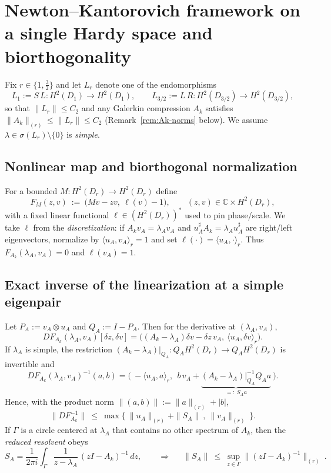 \documentclass[11pt]{article}
\begin{document}
\section{Newton--Kantorovich framework on a single Hardy space and biorthogonality}
\label{sec:NK-single}

Fix \(r\in\{1,\tfrac32\}\) and let \(L_r\) denote one of the endomorphisms
\[
L_1:=S\,L: H^2(D_1)\to H^2(D_1),
\qquad
L_{3/2}:=L\,R: H^2(D_{3/2})\to H^2(D_{3/2}),
\]
so that \(\|L_r\|\le C_2\) and any Galerkin compression \(A_k\) satisfies
\(\|A_k\|_{(r)}\le \|L_r\|\le C_2\) (Remark~\ref{rem:Ak-norms} below).
We assume \(\lambda\in\sigma(L_r)\setminus\{0\}\) is \emph{simple}.

\subsection*{Nonlinear map and biorthogonal normalization}
For a bounded \(M:H^2(D_r)\to H^2(D_r)\) define
\[
F_M(z,v)\ :=\ \big(Mv-zv,\ \ell(v)-1\big),\qquad (z,v)\in\mathbb C\times H^2(D_r),
\]
with a fixed linear functional \(\ell\in (H^2(D_r))^\ast\) used to pin phase/scale.
We take \(\ell\) from the \emph{discretization}: if \(A_k v_A=\lambda_A v_A\) and
\(u_A^\sharp A_k=\lambda_A u_A^\sharp\) are right/left eigenvectors, normalize by
\(\langle u_A,v_A\rangle_r=1\) and set \(\ell(\cdot)=\langle u_A,\cdot\rangle_r\).
Thus \(F_{A_k}(\lambda_A,v_A)=0\) and \(\ell(v_A)=1\).

\subsection*{Exact inverse of the linearization at a simple eigenpair}
Let \(P_A:=v_A\otimes u_A\) and \(Q_A:=I-P_A\).
Then for the derivative at \((\lambda_A,v_A)\),
\[
DF_{A_k}(\lambda_A,v_A)[\delta z,\delta v]
=\big((A_k-\lambda_A)\delta v-\delta z\,v_A,\ \langle u_A,\delta v\rangle_r\big).
\]
If \(\lambda_A\) is simple, the restriction
\((A_k-\lambda_A)|_{Q_A}:Q_AH^2(D_r)\to Q_AH^2(D_r)\) is invertible and
\[
\boxed{\quad
DF_{A_k}(\lambda_A,v_A)^{-1}(a,b)
= \big(\ -\langle u_A,a\rangle_r,\ \ b\,v_A + \underbrace{(A_k-\lambda_A)|_{Q_A}^{-1}Q_A a}_{=:~S_A a}\ \big).
\quad}
\]
Hence, with the product norm \(\|(a,b)\|:=\|a\|_{(r)}+|b|\),
\[
\|DF_{A_k}^{-1}\|\ \le\ \max\big\{\ \|u_A\|_{(r)}+\|S_A\|\ ,\ \|v_A\|_{(r)}\ \big\}.
\]
If \(\Gamma\) is a circle centered at \(\lambda_A\) that contains no other spectrum of \(A_k\),
then the \emph{reduced resolvent} obeys
\[
S_A=\frac{1}{2\pi i}\int_\Gamma \frac{1}{z-\lambda_A}\,(zI-A_k)^{-1}\,dz,
\qquad
\Rightarrow\quad
\boxed{\ \ \|S_A\|\ \le\ \sup_{z\in\Gamma}\|(zI-A_k)^{-1}\|_{(r)}\ .\ }
\]
\end{document}
